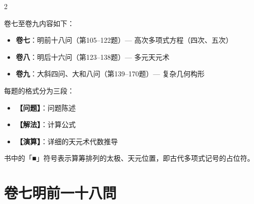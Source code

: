 \documentclass[11pt,a4paper]{article}
\begin{document}
\begin{paracol}{2}
\begin{rightcolumn}
{{卷七至卷九内容如下：
\begin{itemize}[leftmargin=1.5em,topsep=0pt]
  \item \textbf{卷七}：明前十八问（第105--122题）--- 高次多项式方程（四次、五次）
  \item \textbf{卷八}：明后十六问（第123--138题）--- 多元天元术
  \item \textbf{卷九}：大斜四问、大和八问（第139--170题）--- 复杂几何构形
\end{itemize}

每题的格式分为三段：
\begin{itemize}[leftmargin=1.5em,topsep=0pt]
  \item \textbf{【问题】}：问题陈述
  \item \textbf{【解法】}：计算公式
  \item \textbf{【演算】}：详细的天元术代数推导
\end{itemize}

书中的「■」符号表示算筹排列的太极、天元位置，即古代多项式记号的占位符。
}}
\end{rightcolumn}

\end{paracol}

\newpage

\section{\tradfont 卷七\quad 明前一十八問}
\label{sec:vol7}

\begin{center}
\end{center}

\vspace{0.5cm}
\end{document}
